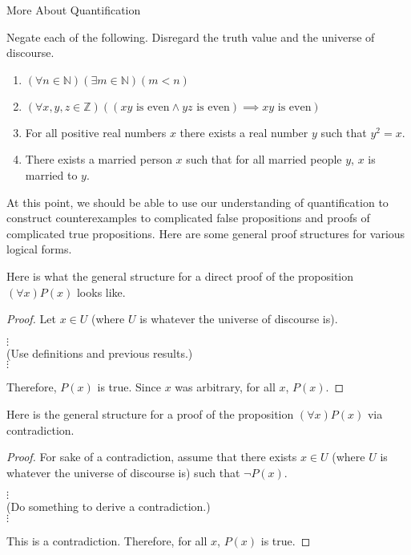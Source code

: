\begin{section}{More About Quantification}
\begin{exercise}
Negate each of the following.  Disregard the truth value and the universe of discourse.
\begin{enumerate}
\item $(\forall n\in\mathbb{N})(\exists m\in\mathbb{N})(m<n)$
\item $(\forall x,y,z\in\mathbb{Z})((xy \mbox{ is even}\wedge yz\mbox{ is even})\implies xy\mbox{ is even})$
\item For all positive real numbers $x$ there exists a real number $y$ such that $y^2=x$.
\item There exists a married person $x$ such that for all married people $y$, $x$ is married to $y$.
\end{enumerate}
\end{exercise}

At this point, we should be able to use our understanding of quantification to construct counterexamples to complicated false propositions and proofs of complicated true propositions.  Here are some general proof structures for various logical forms.

\begin{skeleton}
Here is what the general structure for a direct proof of the proposition $(\forall x)P(x)$ looks like.

\bigskip

\begin{textbox}
\begin{proof}
Let $x \in U$ (where $U$ is whatever the universe of discourse is).
\begin{center}
$\vdots$\\
(Use definitions and previous results.)\\
$\vdots$
\end{center}
\noindent Therefore, $P(x)$ is true.  Since $x$ was arbitrary, for all $x$, $P(x)$.
\end{proof}
\end{textbox}

\end{skeleton}

\begin{skeleton}
Here is the general structure for a proof of the proposition $(\forall x)P(x)$ via contradiction.

\bigskip

\begin{textbox}
\begin{proof}
For sake of a contradiction, assume that there exists $x\in U$ (where $U$ is whatever the universe of discourse is) such that $\neg P(x)$.
\begin{center}
$\vdots$\\
(Do something to derive a contradiction.)\\
$\vdots$
\end{center}
\noindent This is a contradiction.  Therefore, for all $x$, $P(x)$ is true.
\end{proof}
\end{textbox}
\end{skeleton}


\end{section}
